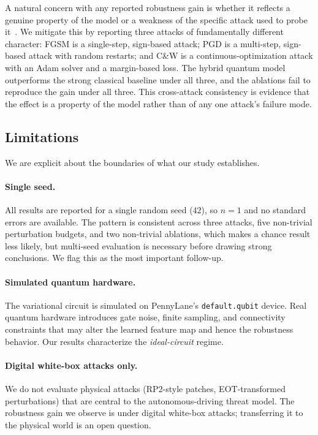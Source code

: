 \documentclass[11pt]{article}
\begin{document}
A natural concern with any reported robustness gain is whether it reflects
a genuine property of the model or a weakness of the specific attack
used to probe it~\cite{tramer2020adaptive}. We mitigate this by
reporting three attacks of fundamentally different character: FGSM is a
single-step, sign-based attack; PGD is a multi-step, sign-based attack
with random restarts; and C\&W is a continuous-optimization attack with
an Adam solver and a margin-based loss. The hybrid quantum model
outperforms the strong classical baseline under all three, and the
ablations fail to reproduce the gain under all three. This
cross-attack consistency is evidence that the effect is a property of the
model rather than of any one attack's failure mode.

\subsection{Limitations}
\label{sec:disc:limits}

We are explicit about the boundaries of what our study establishes.

\paragraph{Single seed.}
All results are reported for a single random seed ($42$), so $n=1$ and
no standard errors are available. The pattern is consistent across three
attacks, five non-trivial perturbation budgets, and two non-trivial
ablations, which makes a chance result less likely, but multi-seed
evaluation is necessary before drawing strong conclusions. We flag this
as the most important follow-up.

\paragraph{Simulated quantum hardware.}
The variational circuit is simulated on PennyLane's
\texttt{default.qubit} device. Real quantum hardware introduces gate
noise, finite sampling, and connectivity constraints that may alter the
learned feature map and hence the robustness behavior. Our results
characterize the \emph{ideal-circuit} regime.

\paragraph{Digital white-box attacks only.}
We do not evaluate physical attacks (RP2-style patches, EOT-transformed
perturbations) that are central to the autonomous-driving threat model.
The robustness gain we observe is under digital white-box attacks;
transferring it to the physical world is an open question.
\end{document}
